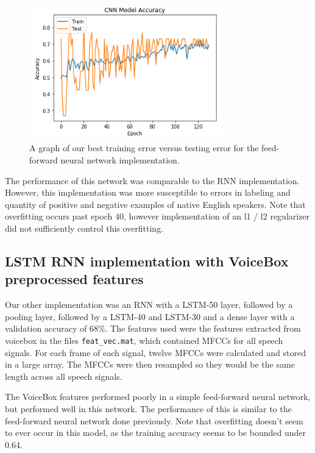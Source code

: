 \documentclass{article}
\begin{document}
\begin{figure}[htb]
	\centering
	\includegraphics[width = 8.5cm]{figs/best_ff_acc}
	\caption{A graph of our best training error versus testing error for the feed-forward neural network implementation.}
	\label{fig:best_ff}
\end{figure}

The performance of this network was comparable to the RNN implementation.
However, this implementation was more susceptible to errors in labeling and quantity of positive and negative examples of native English speakers.
Note that overfitting occurs past epoch 40, however implementation of an  l1 / l2 regularizer did not sufficiently control this overfitting.

\subsection{LSTM RNN implementation with VoiceBox preprocessed features}
\label{subsec:rnn}

Our other implementation was an RNN with a LSTM-50 layer, followed by a pooling layer, followed by a LSTM-40 and LSTM-30 and a dense layer with a validation accuracy of 68\%.
The features used were the features extracted from voicebox in the files \texttt{feat\_vec.mat}, which contained MFCCs for all speech signals.
For each frame of each signal, twelve MFCCs were calculated and stored in a large array.
The MFCCs were then resampled so they would be the same length across all speech signals.

The VoiceBox features performed poorly in a simple feed-forward neural network, but performed well in this network.
The performance of this is similar to the feed-forward neural network done previously.
Note that overfitting doesn’t seem to ever occur in this model, as the training accuracy seems to be bounded under 0.64.
\end{document}
